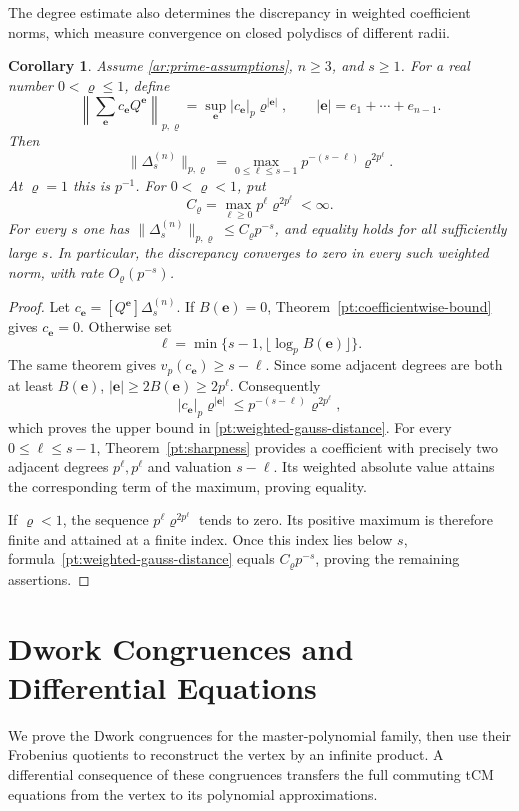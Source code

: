 \documentclass[11pt]{amsart}
\newtheorem{corollary}[theorem]{Corollary}
\theoremstyle{definition}
\theoremstyle{remark}
\numberwithin{equation}{section}
\begin{document}
The degree estimate also determines the discrepancy in weighted
coefficient norms, which measure convergence on closed
polydiscs of different radii.

\begin{corollary}\label{pt:weighted-gauss}
Assume \eqref{ar:prime-assumptions}, $n\geq3$, and $s\geq1$.
For a real number $0<\varrho\leq1$, define
\[
 \left\|\sum_{\boldsymbol e}c_{\boldsymbol e}Q^{\boldsymbol e}
 \right\|_{p,\varrho}
 =\sup_{\boldsymbol e}|c_{\boldsymbol e}|_p
      \varrho^{|\boldsymbol e|},
 \qquad |\boldsymbol e|=e_1+\cdots+e_{n-1}.
\]
Then
\begin{equation}\label{pt:weighted-gauss-distance}
 \|\Delta_s^{(n)}\|_{p,\varrho}
 =\max_{0\leq\ell\leq s-1}
      p^{-(s-\ell)}\varrho^{2p^\ell}.
\end{equation}
At $\varrho=1$ this is $p^{-1}$. For $0<\varrho<1$, put
\[
 C_{\varrho}=\max_{\ell\geq0}p^\ell\varrho^{2p^\ell}<\infty.
\]
For every $s$ one has
$\|\Delta_s^{(n)}\|_{p,\varrho}\leq C_{\varrho}p^{-s}$,
and equality holds for all sufficiently large $s$.
In particular, the discrepancy converges to zero in every such
weighted norm, with rate $O_{\varrho}(p^{-s})$.
\end{corollary}

\begin{proof}
Let $c_{\boldsymbol e}=[Q^{\boldsymbol e}]\Delta_s^{(n)}$.
If $B(\boldsymbol e)=0$, Theorem~\ref{pt:coefficientwise-bound}
gives $c_{\boldsymbol e}=0$. Otherwise set
\[
 \ell=\min\{s-1,\lfloor\log_p B(\boldsymbol e)\rfloor\}.
\]
The same theorem gives $v_p(c_{\boldsymbol e})\geq s-\ell$.
Since some adjacent degrees are both at least
$B(\boldsymbol e)$,
$|\boldsymbol e|\geq2B(\boldsymbol e)\geq2p^\ell$.
Consequently
\[
 |c_{\boldsymbol e}|_p\varrho^{|\boldsymbol e|}
 \leq p^{-(s-\ell)}\varrho^{2p^\ell},
\]
which proves the upper bound in
\eqref{pt:weighted-gauss-distance}.
For every $0\leq\ell\leq s-1$, Theorem~\ref{pt:sharpness}
provides a coefficient with precisely two adjacent degrees
$p^\ell,p^\ell$ and valuation $s-\ell$. Its weighted absolute
value attains the corresponding term of the maximum, proving
equality.

If $\varrho<1$, the sequence
$p^\ell\varrho^{2p^\ell}$ tends to zero. Its positive maximum
is therefore finite and attained at a finite index. Once this
index lies below $s$, formula~\eqref{pt:weighted-gauss-distance}
equals $C_{\varrho}p^{-s}$, proving the remaining assertions.
\end{proof}


\section{Dwork Congruences and Differential Equations}
\label{ar:section-ghosts}
We prove the Dwork congruences for the master-polynomial family,
then use their Frobenius quotients to reconstruct the vertex by
an infinite product. A differential consequence of these
congruences transfers the full commuting tCM equations from
the vertex to its polynomial approximations.
\end{document}

